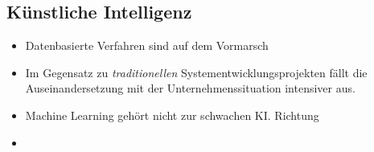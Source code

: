 \documentclass[12pt,a4paper]{article}
\begin{document}
\vspace*{0.5cm}
\subsection{Künstliche Intelligenz} %
\begin{itemize}
   \item Datenbasierte Verfahren sind auf dem Vormarsch
   \item Im Gegensatz zu \emph{traditionellen} Systementwicklungsprojekten fällt die Auseinandersetzung mit der Unternehmenssituation intensiver aus.
   \item Machine Learning gehört nicht zur schwachen KI. Richtung
   \item 
\end{itemize}
\end{document}
